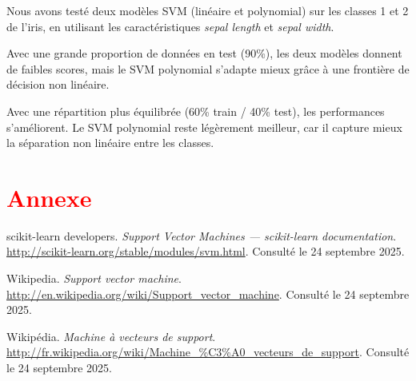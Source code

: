 \documentclass[
  12pt,
]{article}
\begin{document}
Nous avons testé deux modèles SVM (linéaire et polynomial) sur les
classes 1 et 2 de l'iris, en utilisant les caractéristiques
\textit{sepal length} et \textit{sepal width}.

Avec une grande proportion de données en test (90\%), les deux modèles
donnent de faibles scores, mais le SVM polynomial s'adapte mieux grâce à
une frontière de décision non linéaire.

Avec une répartition plus équilibrée (60\% train / 40\% test), les
performances s'améliorent. Le SVM polynomial reste légèrement meilleur,
car il capture mieux la séparation non linéaire entre les classes.

\newpage

\section{\texorpdfstring{\textcolor{red}{Annexe}}{}}\label{section-4}

\begin{thebibliography}{9}

scikit-learn developers.  
\textit{Support Vector Machines — scikit-learn documentation}.  
\url{http://scikit-learn.org/stable/modules/svm.html}.  
Consulté le 24 septembre 2025.

Wikipedia.  
\textit{Support vector machine}.  
\url{http://en.wikipedia.org/wiki/Support_vector_machine}.  
Consulté le 24 septembre 2025.

Wikipédia.  
\textit{Machine à vecteurs de support}.  
\url{http://fr.wikipedia.org/wiki/Machine_%C3%A0_vecteurs_de_support}.  %
Consulté le 24 septembre 2025.

\end{thebibliography}
\end{document}
